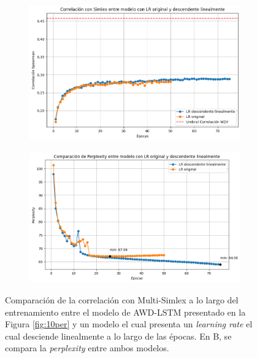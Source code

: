 
\begin{figure}[htb]
    \centering
    \begin{subfigure}[b]{0.45\textwidth}
        \centering
        \includegraphics[width=1\textwidth]{imagenes/simlex_corr_lrdescendente.png}
        \caption{}
        \label{fig:simlex_corr_lrdescendente.png}
    \end{subfigure}
    \hfill
    \begin{subfigure}[b]{0.45\textwidth}
        \centering
        \includegraphics[width=1\textwidth]{imagenes/perp_lr_descendente.png}
        \caption{}
        \label{fig:perp_lr_descendente.png}
    \end{subfigure}
    \caption{Comparación de la correlación con Multi-Simlex a lo largo del entrenamiento 
    entre el modelo de AWD-LSTM presentado en la Figura \ref{fig:10per} y un modelo el cual 
    presenta un \textit{learning rate} el cual desciende linealmente a lo largo de las 
    épocas. En B, se compara la \textit{perplexity} entre ambos modelos.}
    \label{fig:lrdescendente}
\end{figure}

